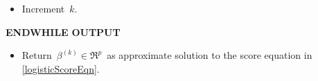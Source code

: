 \begin{proposition}
\begin{enumerate}
\begin{center}
\begin{minipage}{6in}
{\begin{itemize}
\begin{equation*}
			\;\; = \;\;
				X^{T} \cdot D(\beta^{(k)}) \cdot X \cdot \beta^{(k)}
				\;+\; X^{T}\cdot\!\left(\,y - \pi(\beta^{(k)})\,\right).
		\end{equation*}
	\item
		Increment \,$k$.	
	\end{itemize}
	\textnormal{\bf ENDWHILE}
	\vskip 0.4cm
	\textnormal{\bf OUTPUT}
	\begin{itemize}
	\item
		Return \,$\beta^{(k)} \in \Re^{p}$\, as approximate solution to the score equation
		in \eqref{logisticScoreEqn}.
	\end{itemize}
	}
	\end{minipage}
	\end{center}
\end{enumerate}
\end{proposition}
\proof
